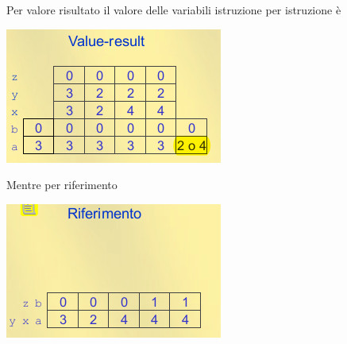 Per valore risultato il valore delle variabili istruzione per istruzione è

\begin{center}
    \includegraphics{../img/valueresult.png}
\end{center}

Mentre per riferimento
\begin{center}
    \includegraphics{../img/riferimento.png}
\end{center}



